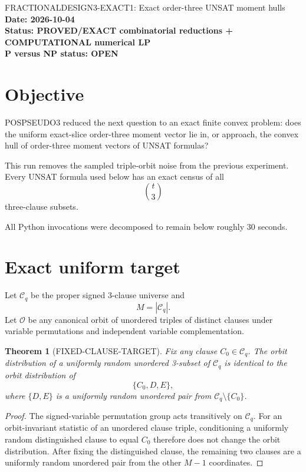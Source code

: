 \documentclass[11pt]{article}
\newtheorem{theorem}{Theorem}
\begin{document}
\begin{center}
{\Large FRACTIONALDESIGN3-EXACT1: Exact order-three UNSAT moment hulls}\\[4pt]
\textbf{Date: 2026-10-04}\\
\textbf{Status: PROVED/EXACT combinatorial reductions + COMPUTATIONAL numerical LP}\\
\textbf{P versus NP status: OPEN}
\end{center}

\section{Objective}

POSPSEUDO3 reduced the next question to an exact finite convex problem:
does the uniform exact-slice order-three moment vector lie in, or approach,
the convex hull of order-three moment vectors of UNSAT formulas?

This run removes the sampled triple-orbit noise from the previous experiment.
Every UNSAT formula used below has an exact census of all
\[
\binom t3
\]
three-clause subsets.

All Python invocations were decomposed to remain below roughly 30 seconds.

\section{Exact uniform target}

Let \(\mathcal C_q\) be the proper signed 3-clause universe and
\[
M=|\mathcal C_q|.
\]
Let \(\mathcal O\) be any canonical orbit of unordered triples of distinct
clauses under variable permutations and independent variable complementation.

\begin{theorem}[FIXED-CLAUSE-TARGET]
Fix any clause \(C_0\in\mathcal C_q\).  The orbit distribution of a uniformly
random unordered 3-subset of \(\mathcal C_q\) is identical to the orbit
distribution of
\[
\{C_0,D,E\},
\]
where \(\{D,E\}\) is a uniformly random unordered pair from
\(\mathcal C_q\setminus\{C_0\}\).
\end{theorem}

\begin{proof}
The signed-variable permutation group acts transitively on
\(\mathcal C_q\).  For an orbit-invariant statistic of an unordered clause
triple, conditioning a uniformly random distinguished clause to equal
\(C_0\) therefore does not change the orbit distribution.  After fixing the
distinguished clause, the remaining two clauses are a uniformly random
unordered pair from the other \(M-1\) coordinates.
\end{proof}
\end{document}
